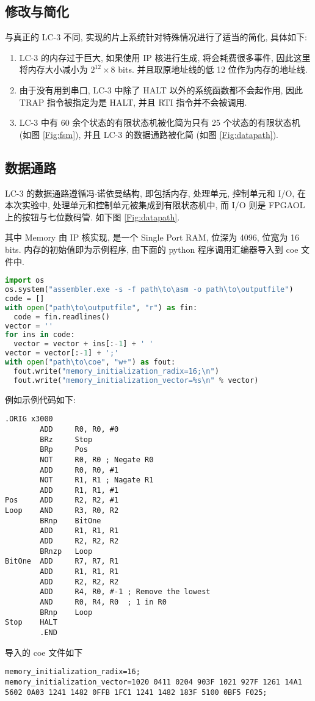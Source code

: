 \documentclass[UTF8,fontset=fandol]{ctexart}
\begin{document}
\subsection*{修改与简化}
与真正的 LC-3 不同, 实现的片上系统针对特殊情况进行了适当的简化, 具体如下:
\begin{enumerate}
  \item LC-3 的内存过于巨大, 如果使用 IP 核进行生成, 将会耗费很多事件, 因此这里将内存大小减小为 $2^{12}\times8$ bits. 并且取原地址线的低 12 位作为内存的地址线.
  \item 由于没有用到串口, LC-3 中除了 HALT 以外的系统函数都不会起作用, 因此 TRAP 指令被指定为是 HALT, 并且 RTI 指令并不会被调用.
  \item LC-3 中有 60 余个状态的有限状态机被化简为只有 25 个状态的有限状态机 (如图 \ref{Fig:fsm}), 并且 LC-3 的数据通路被化简 (如图 \ref{Fig:datapath}).
\end{enumerate}
\newpage
\subsection*{数据通路}
LC-3 的数据通路遵循冯$\cdot$诺依曼结构, 即包括内存, 处理单元, 控制单元和 I/O, 在本次实验中, 处理单元和控制单元被集成到有限状态机中, 而 I/O 则是 FPGAOL 上的按钮与七位数码管. 如下图 \ref{Fig:datapath}.

其中 Memory 由 IP 核实现, 是一个 Single Port RAM, 位深为 4096, 位宽为 16 bits. 内存的初始值即为示例程序, 由下面的 python 程序调用汇编器导入到 coe 文件中.
\begin{lstlisting}[style = {verilogstyle}, language=python, caption = {初始化内存的 Python 程序}] 
import os
os.system("assembler.exe -s -f path\to\asm -o path\to\outputfile")
code = []
with open("path\to\outputfile", "r") as fin:
  code = fin.readlines()
vector = ''
for ins in code:
  vector = vector + ins[:-1] + ' '
vector = vector[:-1] + ';'
with open("path\to\coe", "w+") as fout:
  fout.write("memory_initialization_radix=16;\n")
  fout.write("memory_initialization_vector=%s\n" % vector)
\end{lstlisting}
例如示例代码如下:
\begin{lstlisting}[style = {verilogstyle}, caption = {示例汇编代码}, label = Code:asm]
        .ORIG x3000
        ADD     R0, R0, #0
        BRz     Stop
        BRp     Pos
        NOT     R0, R0 ; Negate R0
        ADD     R0, R0, #1
        NOT     R1, R1 ; Nagate R1
        ADD     R1, R1, #1
Pos     ADD     R2, R2, #1
Loop    AND     R3, R0, R2
        BRnp    BitOne
        ADD     R1, R1, R1
        ADD     R2, R2, R2
        BRnzp   Loop
BitOne  ADD     R7, R7, R1
        ADD     R1, R1, R1
        ADD     R2, R2, R2
        ADD     R4, R0, #-1 ; Remove the lowest
        AND     R0, R4, R0  ; 1 in R0
        BRnp    Loop
Stop    HALT
        .END
\end{lstlisting}
导入的 coe 文件如下
\begin{lstlisting}[style = {verilogstyle}, caption = {coe 文件}, breaklines=true]
memory_initialization_radix=16;
memory_initialization_vector=1020 0411 0204 903F 1021 927F 1261 14A1 5602 0A03 1241 1482 0FFB 1FC1 1241 1482 183F 5100 0BF5 F025;  
\end{lstlisting}
\end{document}
